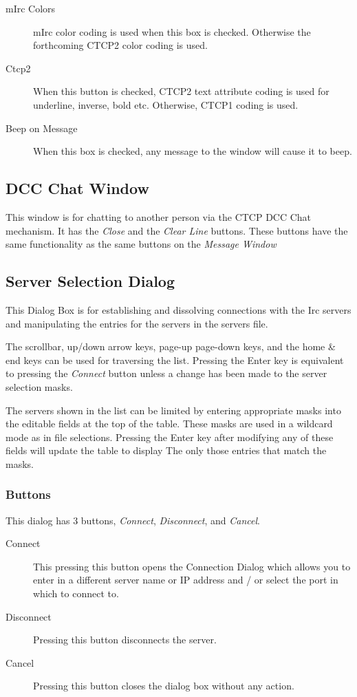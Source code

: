 \documentclass[titlepage]{article}
\begin{document}
\begin{description}
\item[mIrc Colors] mIrc color coding is used when this box is checked. Otherwise the
forthcoming CTCP2 color coding is used.
\item[Ctcp2] When this button is checked, CTCP2 text attribute coding is used for underline,
inverse, bold etc. Otherwise, CTCP1 coding is used.
\item[Beep on Message] When this box is checked, any message to the window will cause it
to beep.
\end{description}

\subsection{DCC Chat Window}
This window is for chatting to another person via the CTCP DCC Chat
mechanism. It has the \textit{Close} and the \textit{Clear Line}
buttons. These buttons have the same functionality as the same buttons
on the \textit{Message Window}

\subsection{Server Selection Dialog}\label{Server Select}
This Dialog Box is for establishing and dissolving connections with the Irc
servers and manipulating the entries for the servers in the servers file.

The scrollbar, up/down arrow keys, page-up page-down keys, and the home \&
end keys can be used for traversing the list. Pressing the Enter key is
equivalent to pressing the \emph{Connect} button unless a change has been
made to the server selection masks.

The servers shown in the list can be limited by entering appropriate masks
into the editable fields at the top of the table. These masks are used in a
wildcard mode as in file selections. Pressing the Enter key after modifying
any of these fields will update the table to display The only those entries
that match the masks.

\subsubsection{Buttons}
This dialog has 3 buttons, \emph{Connect}, \emph{Disconnect}, and \emph{Cancel}. 

\begin{description}
\item[Connect] This pressing this button opens the Connection Dialog which
allows you to enter in a different server name or IP address and / or
select the port in which to connect to.
\item[Disconnect] Pressing this button disconnects the server.
\item[Cancel] Pressing this button closes the dialog box without any
action.
\end{description}
\end{document}
